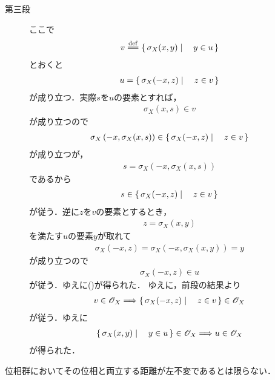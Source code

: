 \begin{sketch}
\begin{description}
			\item[第三段]
				ここで
				\begin{align}
					v \defeq \Set{\sigma_X(x,y)}{y \in u}
				\end{align}
				とおくと
				\begin{align}
					u = \left\{\, \sigma_X(-x,z) \mid \quad z \in v\, \right\}
					\label{fom:thm_topology_induced_by_left_invariant_metric_is_invariant_3}
				\end{align}
				が成り立つ．実際$s$を$u$の要素とすれば，
				\begin{align}
					\sigma_X(x,s) \in v
				\end{align}
				が成り立つので
				\begin{align}
					\sigma_X\left(-x,\sigma_X(x,s)\right) \in \left\{\, \sigma_X(-x,z) \mid \quad z \in v\, \right\}
				\end{align}
				が成り立つが，
				\begin{align}
					s = \sigma_X\left(-x,\sigma_X(x,s)\right)
				\end{align}
				であるから
				\begin{align}
					s \in \left\{\, \sigma_X(-x,z) \mid \quad z \in v\, \right\}
				\end{align}
				が従う．逆に$z$を$v$の要素とするとき，
				\begin{align}
					z = \sigma_X\left(x,y\right)
				\end{align}
				を満たす$u$の要素$y$が取れて
				\begin{align}
					\sigma_X\left(-x,z\right)
					= \sigma_X\left(-x,\sigma_X\left(x,y\right)\right)
					= y
				\end{align}
				が成り立つので
				\begin{align}
					\sigma_X\left(-x,z\right) \in u
				\end{align}
				が従う．ゆえに()が得られた．
				ゆえに，前段の結果より
				\begin{align}
					v \in \mathscr{O}_X \Longrightarrow \left\{\, \sigma_X(-x,z) \mid \quad z \in v\, \right\} \in \mathscr{O}_X
				\end{align}
				が従う．ゆえに
				\begin{align}
					\left\{\, \sigma_X(x,y) \mid \quad y \in u\, \right\} \in \mathscr{O}_X \Longrightarrow u \in \mathscr{O}_X
				\end{align}
				が得られた．
				\QED
		\end{description}
	\end{sketch}
	
	位相群においてその位相と両立する距離が左不変であるとは限らない．
	
